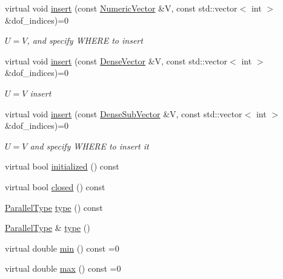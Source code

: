 \begin{DoxyCompactItemize}
virtual void \mbox{\hyperlink{classfemus_1_1_numeric_vector_a993c202d43f23f0e81d74b635cc5c3ba}{insert}} (const \mbox{\hyperlink{classfemus_1_1_numeric_vector}{Numeric\+Vector}} \&V, const std\+::vector$<$ int $>$ \&dof\+\_\+indices)=0
\begin{DoxyCompactList}\small\item\em $U=V$, and specify W\+H\+E\+RE to insert \end{DoxyCompactList}\item 
virtual void \mbox{\hyperlink{classfemus_1_1_numeric_vector_aa141a3133a2a35962713cb331d8137f3}{insert}} (const \mbox{\hyperlink{classfemus_1_1_dense_vector}{Dense\+Vector}} \&V, const std\+::vector$<$ int $>$ \&dof\+\_\+indices)=0
\begin{DoxyCompactList}\small\item\em $ U=V $ insert \end{DoxyCompactList}\item 
virtual void \mbox{\hyperlink{classfemus_1_1_numeric_vector_aa8ba2833d62343508676066556bbe506}{insert}} (const \mbox{\hyperlink{classfemus_1_1_dense_sub_vector}{Dense\+Sub\+Vector}} \&V, const std\+::vector$<$ int $>$ \&dof\+\_\+indices)=0
\begin{DoxyCompactList}\small\item\em $ U=V $ and specify W\+H\+E\+RE to insert it \end{DoxyCompactList}\item 
virtual bool \mbox{\hyperlink{classfemus_1_1_numeric_vector_a26d8ccf5f86fae43264918ce337488b7}{initialized}} () const
\item 
virtual bool \mbox{\hyperlink{classfemus_1_1_numeric_vector_a34f55bd075ab087a8b6c2d10fe962f0a}{closed}} () const
\item 
\mbox{\hyperlink{_paralleltype_enum_8hpp_a55f694af2ca20b6481914237cf7e567c}{Parallel\+Type}} \mbox{\hyperlink{classfemus_1_1_numeric_vector_a426f4ebb35ef955a10b0e6f954120658}{type}} () const
\item 
\mbox{\hyperlink{_paralleltype_enum_8hpp_a55f694af2ca20b6481914237cf7e567c}{Parallel\+Type}} \& \mbox{\hyperlink{classfemus_1_1_numeric_vector_aea604bf48a5a24f0a7e3716c3e955820}{type}} ()
\item 
virtual double \mbox{\hyperlink{classfemus_1_1_numeric_vector_a243fa2b85e0ef03df5b6ce7096cd4700}{min}} () const =0
\item 
virtual double \mbox{\hyperlink{classfemus_1_1_numeric_vector_a8eda5468f45a3115fc55faf3aca9f57b}{max}} () const =0
\item 

\end{DoxyCompactItemize}
